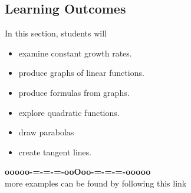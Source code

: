 \documentclass{ximera}
\begin{document}
\subsection*{Learning Outcomes}



\begin{sectionOutcomes}
In this section, students will 

\begin{itemize}
\item examine constant growth rates.
\item produce graphs of linear functions.
\item produce formulas from graphs.
\item explore quadratic functions.
\item draw parabolas
\item create tangent lines.
\end{itemize}
\end{sectionOutcomes}




















\begin{onlineOnly}
\begin{center}
\textbf{\textcolor{green!50!black}{ooooo-=-=-=-ooOoo-=-=-=-ooooo}} \\

more examples can be found by following this link\\ 

\end{center}
\end{onlineOnly}
\end{document}
